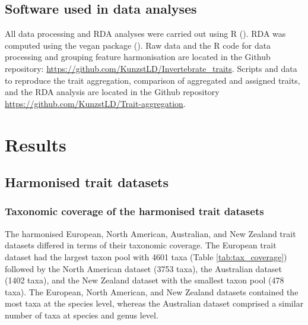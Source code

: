 \documentclass[12pt]{article}
\begin{document}

\subsection*{Software used in data analyses}

All data processing and RDA analyses were carried out using R (\cite{cite_R}). RDA was computed using the vegan package (\cite{cite_vegan}). Raw data and the R code for data processing and grouping feature harmonisation are located in the Github repository: \url{https://github.com/KunzstLD/Invertebrate_traits}. Scripts and data to reproduce the trait aggregation, comparison of aggregated and assigned traits, and the RDA analysis are located in the Github repository \url{https://github.com/KunzstLD/Trait-aggregation}.

\newpage


\section*{Results}

\subsection*{Harmonised trait datasets}

\subsubsection*{Taxonomic coverage of the harmonised trait datasets}

The harmonised European, North American, Australian, and New Zealand trait datasets differed in terms of their taxonomic coverage. The European trait dataset had the largest taxon pool with 4601 taxa (Table \ref{tab:tax_coverage}) followed by the North American dataset (3753 taxa), the Australian dataset (1402 taxa), and the New Zealand dataset with the smallest taxon pool (478 taxa). The European, North American, and New Zealand datasets contained the most taxa at the species level, whereas the Australian dataset comprised a similar number of taxa at species and genus level.
\end{document}
